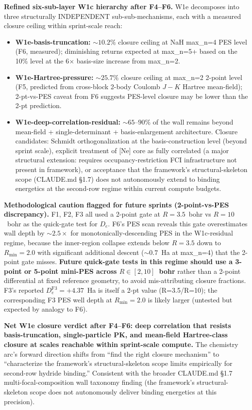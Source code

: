 \documentclass[aps,pra,twocolumn,superscriptaddress,longbibliography]{revtex4-2}
\begin{document}
\textbf{Refined six-sub-layer W1c hierarchy after F4--F6.}
W1e decomposes into three structurally INDEPENDENT sub-sub-mechanisms,
each with a measured closure ceiling within sprint-scale reach:
\begin{itemize}\setlength\itemsep{0pt}
\item \textbf{W1e-basis-truncation:} ${\sim}10.2\%$ closure ceiling
  at NaH max\_n=4 PES level (F6, measured); diminishing returns
  expected at max\_n=5+ based on the 10\% level at the 6$\times$
  basis-size increase from max\_n=2.
\item \textbf{W1e-Hartree-pressure:} ${\sim}25.7\%$ closure ceiling
  at max\_n=2 2-point level (F5, predicted from cross-block 2-body
  Coulomb $J - K$ Hartree mean-field); 2-pt-vs-PES caveat from F6
  suggests PES-level closure may be lower than the 2-pt prediction.
\item \textbf{W1e-deep-correlation-residual:} ${\sim}65$--$90\%$ of
  the wall remains beyond mean-field + single-determinant +
  basis-enlargement architecture. Closure candidates: Schmidt
  orthogonalization at the basis-construction level (beyond sprint
  scale), explicit treatment of [Ne] core as fully correlated
  (a major structural extension: requires occupancy-restriction FCI
  infrastructure not present in framework), or acceptance that the framework's
  structural-skeleton scope (CLAUDE.md §1.7) does not autonomously
  extend to binding energetics at the second-row regime within
  current compute budgets.
\end{itemize}

\textbf{Methodological caution flagged for future sprints
(2-point-vs-PES discrepancy).} F1, F2, F3 all used a 2-point gate
at $R = 3.5$~bohr vs $R = 10$~bohr as the quick-gate test for $D_e$.
F6's PES scan reveals this gate overestimates wall depth by
${\sim}2.5\times$ for monotonically-descending PES in the W1c-residual
regime, because the inner-region collapse extends below $R = 3.5$
down to $R_\text{min} = 2.0$ with significant additional descent
(${\sim}0.7$~Ha at max\_n=4) that the 2-point gate misses. \textbf{Future
quick-gate tests in this regime should use a 3-point or 5-point
mini-PES across $R \in [2, 10]$~bohr} rather than a 2-point
differential at fixed reference geometry, to avoid mis-attributing
closure fractions. F3's reported $D_e^\text{F3} = +4.37$~Ha is itself
a 2-pt value (R=3.5/R=10); the corresponding F3 PES well depth at
$R_\text{min}=2.0$ is likely larger (untested but expected by analogy
to F6).

\textbf{Net W1e closure verdict after F4--F6: deep correlation that
resists basis-truncation, single-particle PK, and mean-field
Hartree-class closure at scales reachable within sprint-scale compute.}
The chemistry arc's forward direction shifts from ``find the right
closure mechanism'' to ``characterize the framework's
structural-skeleton scope limits empirically for second-row hydride
binding.'' Consistent with the broader CLAUDE.md §1.7
multi-focal-composition wall taxonomy finding (the framework's
structural-skeleton scope does not autonomously deliver binding
energetics at this precision).
\end{document}
